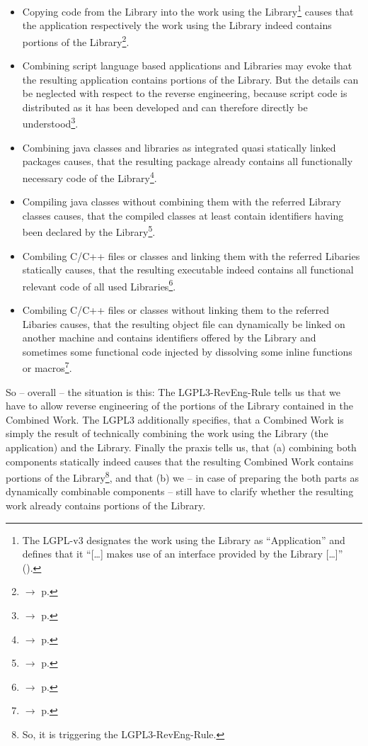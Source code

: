 \begin{itemize}
  \item Copying code from the Library into the work using the
  Library\footnote{The LGPL-v3 designates the work using the Library as
  \enquote{Application} and defines that it \enquote{[\ldots] makes use of an
  interface provided by the Library [\ldots]} (\cite[cf.][\nopage wp.,
  §0]{Lgpl30OsiLicense2007a}).} causes that the application respectively the
  work using the Library indeed contains portions of the
  Library\footnote{$\rightarrow$ p. \pageref{RevEngCopyCodeManually}}.
  \item Combining script language based applications and Libraries may evoke
  that the resulting application contains portions of the Library. But the
  details can be neglected with respect to the reverse engineering, because
  script code is distributed as it has been developed and can therefore directly
  be understood\footnote{$\rightarrow$ p. \pageref{RevEngDistributeScripts}}.
  \item Combining java classes and libraries as integrated quasi statically
  linked packages causes, that the resulting package already contains all
  functionally necessary code of the Library\footnote{$\rightarrow$ p.
  \pageref{RevEngDistributeStaticallyCombinedByteCode}}.
  \item Compiling java classes without combining them with the referred Library
  classes causes, that the compiled classes at least contain identifiers having
  been declared by the Library\footnote{$\rightarrow$ p.
  \pageref{RevEngDistributeDynamicallyLinkedCode}}.
  \item Combiling C/C++ files or classes and linking them with the referred
  Libaries statically causes, that the resulting executable indeed contains all
  functional relevant code of all used Libraries\footnote{$\rightarrow$ p.
  \pageref{RevEngDistributeStaticallyLinkedBinaries}}.
  \item Combiling C/C++ files or classes without linking them to the referred
  Libaries causes, that the resulting object file can dynamically be linked on
  another machine and contains identifiers offered by the Library and sometimes
  some functional code injected by dissolving some inline functions or
  macros\footnote{$\rightarrow$ p.
  \pageref{RevEngDistributeDynamicallyLinkedCode}}.
\end{itemize}

So -- overall -- the situation is this: The LGPL3-RevEng-Rule tells us that we
have to allow reverse engineering of the portions of the Library
contained in the Combined Work. The LGPL3 additionally specifies, that a Combined Work
is simply the result of technically combining the work using the Library (the
application) and the Library. Finally the praxis tells us, that (a) combining
both components statically indeed causes that the resulting Combined Work contains
portions of the Library\footnote{So, it is triggering the LGPL3-RevEng-Rule.},
and that (b) we -- in case of preparing the both parts as dynamically
combinable components -- still have to clarify whether the resulting work
already contains portions of the Library.

